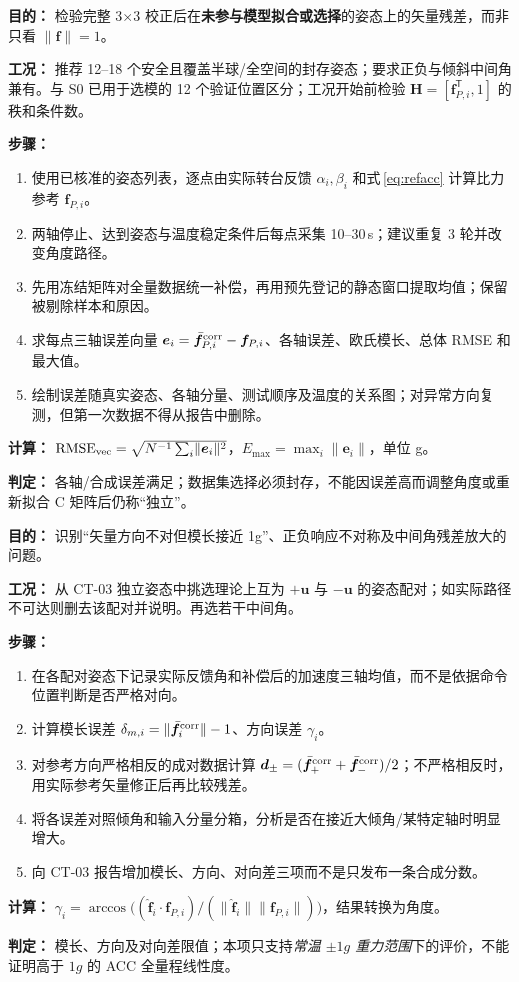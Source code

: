\textbf{目的：} 检验完整 3$\times$3 校正后在\textbf{未参与模型拟合或选择}的姿态上的矢量残差，而非只看 $\lVert \bm f\rVert=1$。
\par\textbf{工况：} 推荐 12--18 个安全且覆盖半球/全空间的封存姿态；要求正负与倾斜中间角兼有。与 S0 已用于选模的 12 个验证位置区分；工况开始前检验 $\mathbf H=[\bm f_{P,i}^{\mathsf T},1]$ 的秩和条件数。
\par\textbf{步骤：}
\begin{enumerate}
\item 使用已核准的姿态列表，逐点由实际转台反馈 $\alpha_i,\beta_i$ 和式\,\eqref{eq:refacc} 计算比力参考 $\bm f_{P,i}$。
\item 两轴停止、达到姿态与温度稳定条件后每点采集 10--30\,s；建议重复 3 轮并改变角度路径。
\item 先用冻结矩阵对全量数据统一补偿，再用预先登记的静态窗口提取均值；保留被剔除样本和原因。
\item 求每点三轴误差向量 $\bm e_i=\bar{\bm f}_{P,i}^{\rm corr}-\bm f_{P,i}$、各轴误差、欧氏模长、总体 RMSE 和最大值。
\item 绘制误差随真实姿态、各轴分量、测试顺序及温度的关系图；对异常方向复测，但第一次数据不得从报告中删除。
\end{enumerate}
\textbf{计算：} $\mathrm{RMSE}_{\rm vec}=\sqrt{N^{-1}\sum_i\lVert\bm e_i\rVert^2}$，$E_{\max}=\max_i\lVert\bm e_i\rVert$，单位 g。
\par\textbf{判定：} 各轴/合成误差满足\pending；数据集选择必须封存，不能因误差高而调整角度或重新拟合 C 矩阵后仍称“独立”。

\textbf{目的：} 识别“矢量方向不对但模长接近 1g”、正负响应不对称及中间角残差放大的问题。
\par\textbf{工况：} 从 CT-03 独立姿态中挑选理论上互为 $+\bm u$ 与 $-\bm u$ 的姿态配对；如实际路径不可达则删去该配对并说明。再选若干中间角。
\par\textbf{步骤：}
\begin{enumerate}
\item 在各配对姿态下记录实际反馈角和补偿后的加速度三轴均值，而不是依据命令位置判断是否严格对向。
\item 计算模长误差 $\delta_{m,i}=\lVert\bar{\bm f}^{\rm corr}_i\rVert-1$、方向误差 $\gamma_i$。
\item 对参考方向严格相反的成对数据计算 $\bm d_{\pm}=(\bar{\bm f}^{\rm corr}_{+}+\bar{\bm f}^{\rm corr}_{-})/2$；不严格相反时，用实际参考矢量修正后再比较残差。
\item 将各误差对照倾角和输入分量分箱，分析是否在接近大倾角/某特定轴时明显增大。
\item 向 CT-03 报告增加模长、方向、对向差三项而不是只发布一条合成分数。
\end{enumerate}
\textbf{计算：} $\gamma_i=\arccos\big((\hat{\bm f}_i\cdot\bm f_{P,i})/(\|\hat{\bm f}_i\|\|\bm f_{P,i}\|)\big)$，结果转换为角度。
\par\textbf{判定：} 模长、方向及对向差限值\pending；本项只支持\emph{常温 $\pm1g$ 重力范围}下的评价，不能证明高于 $1g$ 的 ACC 全量程线性度。

